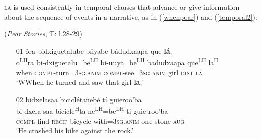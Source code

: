 \textsc{la} is used consistently in temporal clauses that advance or give information about the sequence of events in a narrative, as in (\ref{whenpear}) and (\ref{temporal2}):

\ea\label{whenpear} (\textit{Pear Stories}, T: l.28-29)
\begin{itemize}
\item[01]
\glll \v{o}ra bidxiguetalube b\'{i}iyabe b\'{a}dudxaapa que \textbf{l\'{a}},  \\
o\textsuperscript{LH}ra bi-dxiguetalu=be\textsuperscript{LH} bi-uuya=be\textsuperscript{LH} badudxaapa que\textsuperscript{LH} la\textsuperscript{H}  \\
when \textsc{compl}-turn=3\textsc{sg.anim} \textsc{compl}-see=3\textsc{sg.anim} girl \textsc{dist} \textsc{la}  \\
\glt `WWhen he turned and saw that girl \textbf{la},'


\item[02]
\glll bidxelasaa bicicl\'{e}taneb\'{e} t\'{i} guieroo'ba  \\
bi-dxela-saa bicicle\textsuperscript{H}ta-ne\textsuperscript{LH}=be\textsuperscript{LH} ti guie-roo'ba  \\
\textsc{compl}-find-\textsc{recip} bicycle-with=3\textsc{sg.anim} one stone-\textsc{aug}  \\
\glt `He crashed his bike against the rock.' 

\end{itemize}
\z

